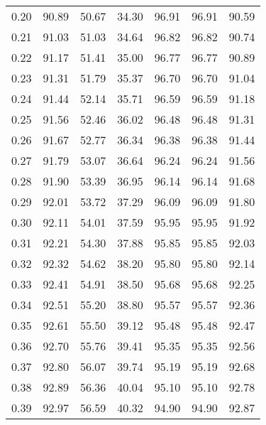 \begin{tabular}{|c|c|c|c|c|c|c|}
      0.20 &     90.89 &     50.67 &      34.30 &   96.91 &      96.91 &         90.59 \\
      0.21 &     91.03 &     51.03 &      34.64 &   96.82 &      96.82 &         90.74 \\
      0.22 &     91.17 &     51.41 &      35.00 &   96.77 &      96.77 &         90.89 \\
      0.23 &     91.31 &     51.79 &      35.37 &   96.70 &      96.70 &         91.04 \\
      0.24 &     91.44 &     52.14 &      35.71 &   96.59 &      96.59 &         91.18 \\
      0.25 &     91.56 &     52.46 &      36.02 &   96.48 &      96.48 &         91.31 \\
      0.26 &     91.67 &     52.77 &      36.34 &   96.38 &      96.38 &         91.44 \\
      0.27 &     91.79 &     53.07 &      36.64 &   96.24 &      96.24 &         91.56 \\
      0.28 &     91.90 &     53.39 &      36.95 &   96.14 &      96.14 &         91.68 \\
      0.29 &     92.01 &     53.72 &      37.29 &   96.09 &      96.09 &         91.80 \\
      0.30 &     92.11 &     54.01 &      37.59 &   95.95 &      95.95 &         91.92 \\
      0.31 &     92.21 &     54.30 &      37.88 &   95.85 &      95.85 &         92.03 \\
      0.32 &     92.32 &     54.62 &      38.20 &   95.80 &      95.80 &         92.14 \\
      0.33 &     92.41 &     54.91 &      38.50 &   95.68 &      95.68 &         92.25 \\
      0.34 &     92.51 &     55.20 &      38.80 &   95.57 &      95.57 &         92.36 \\
      0.35 &     92.61 &     55.50 &      39.12 &   95.48 &      95.48 &         92.47 \\
      0.36 &     92.70 &     55.76 &      39.41 &   95.35 &      95.35 &         92.56 \\
      0.37 &     92.80 &     56.07 &      39.74 &   95.19 &      95.19 &         92.68 \\
      0.38 &     92.89 &     56.36 &      40.04 &   95.10 &      95.10 &         92.78 \\
      0.39 &     92.97 &     56.59 &      40.32 &   94.90 &      94.90 &         92.87 \\

\end{tabular}
